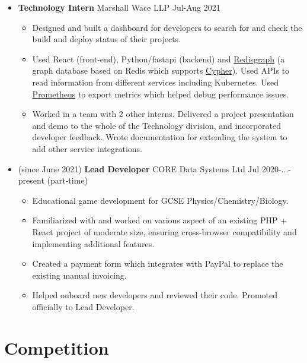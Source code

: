   \begin{itemize}
    \item \textbf{Technology Intern} \dashdiv{} Marshall Wace LLP \dashdiv{} Jul-Aug 2021

    \begin{itemize}
      \item Designed and built a dashboard for developers to search for and check the build and deploy status of their projects.
      \item Used React (front-end), Python/fastapi (backend) and \href{https://oss.redis.com/redisgraph/}{\color{link}Redisgraph} (a graph database based on Redis which supports \href{https://neo4j.com/developer/cypher/}{\color{link}Cypher}). Used APIs to read information from different services including Kubernetes. Used \href{https://prometheus.io/}{\color{link}Prometheus} to export metrics which helped debug performance issues.
      \item Worked in a team with 2 other interns. Delivered a project presentation and demo to the whole of the Technology division, and incorporated developer feedback. Wrote documentation for extending the system to add other service integrations.
    \end{itemize}

    \item (since June 2021) \textbf{Lead Developer} \dashdiv{} CORE Data Systems Ltd \dashdiv{} Jul 2020-$\ldots$-present (part-time)

    \begin{itemize}
      \item Educational game development for GCSE Physics/Chemistry/Biology.
      \item Familiarized with and worked on various aspect of an existing PHP + React project of moderate size, ensuring cross-browser compatibility and implementing additional features.
      \item Created a payment form which integrates with PayPal to replace the existing manual invoicing.
      \item Helped onboard new developers and reviewed their code. Promoted officially to Lead Developer.
    \end{itemize}
  \end{itemize}

  \section{Competition}

